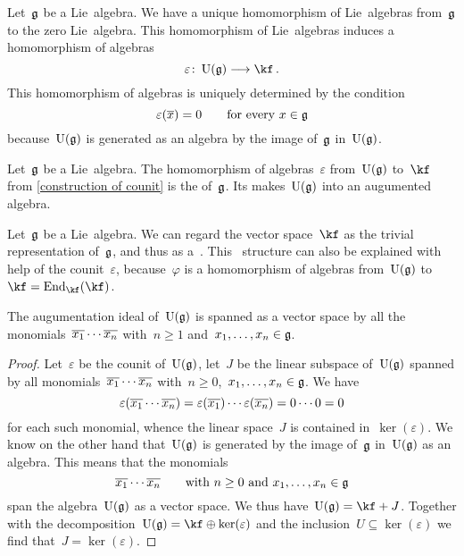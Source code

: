 \begin{construction}
	\label{construction of counit}
	Let~$\mathfrak{g}$ be a Lie~algebra.
	We have a unique homomorphism of Lie~algebras from~$\mathfrak{g}$ to the zero Lie~algebra.
	This homomorphism of Lie~algebras induces a homomorphism of algebras
	\[
		\varepsilon
		\colon
		\Univ(\glie)
		\to
		\kf \,.
	\]
	This homomorphism of algebras is uniquely determined by the condition
	\[
		\varepsilon( \overline{x} ) = 0
		\qquad
		\text{for every~$x \in \mathfrak{g}$}
	\]
	because~$\Univ(\glie)$ is generated as an algebra by the image of~$\mathfrak{g}$ in~$\Univ(\glie)$.
\end{construction}


\begin{definition}
	Let~$\mathfrak{g}$ be a Lie~algebra.
	The homomorphism of algebras~$\varepsilon$ from~$\Univ(\glie)$ to~$\kf$ from \cref{construction of counit} is the  of~$\mathfrak{g}$.
	Its makes~$\Univ(\glie)$ into an augumented algebra.
\end{definition}


\begin{remark}
	Let~$\mathfrak{g}$ be a Lie~algebra.
	We can regard the vector space~$\kf$ as the trivial representation of~$\mathfrak{g}$, and thus as a~\module{$\Univ(\glie)$}.
	This~\module{$\Univ(\glie)$} structure can also be explained with help of the counit~$\varepsilon$, because~$\varphi$ is a homomorphism of algebras from~$\Univ(\glie)$ to~$\kf = \End_{\kf}(\kf)$.
\end{remark}


\begin{proposition}
	\label{augumentation ideal is spanned by monomials}
	The augumentation ideal of~$\Univ(\glie)$ is spanned as a vector space by all the monomials~$\overline{x_1} \dotsm \overline{x_n}$ with~$n \geq 1$ and~$x_1, \dotsc, x_n \in \mathfrak{g}$.
\end{proposition}


\begin{proof}
	Let~$\varepsilon$ be the counit of~$\Univ(\glie)$, let~$J$ be the linear subspace of~$\Univ(\glie)$ spanned by all monomials~$\overline{x_1} \dotsm \overline{x_n}$ with~$n \geq 0$,~$x_1, \dotsc, x_n \in \mathfrak{g}$.
	We have
	\[
		\varepsilon( \overline{x_1} \dotsm \overline{x_n} )
		=
		\varepsilon( \overline{x_1} ) \dotsm \varepsilon( \overline{x_n} )
		=
		0 \dotsm 0
		=
		0
	\]
	for each such monomial, whence the linear space~$J$ is contained in~$\ker(\varepsilon)$.
	We know on the other hand that~$\Univ(\glie)$ is generated by the image of~$\mathfrak{g}$ in~$\Univ(\glie)$ as an algebra.
	This means that the monomials
	\[
		\overline{x_1}  \dotsm \overline{x_n}
		\qquad
		\text{with~$n \geq 0$ and~$x_1, \dotsc, x_n \in \mathfrak{g}$}
	\]
	span the algebra~$\Univ(\glie)$ as a vector space.
	We thus have~$\Univ(\glie) = \kf + J$.
	Together with the decomposition~$\Univ(\glie) = \kf \oplus \ker(\varepsilon)$ and the inclusion~$U \subseteq \ker(\varepsilon)$ we find that~$J = \ker(\varepsilon)$.
\end{proof}



